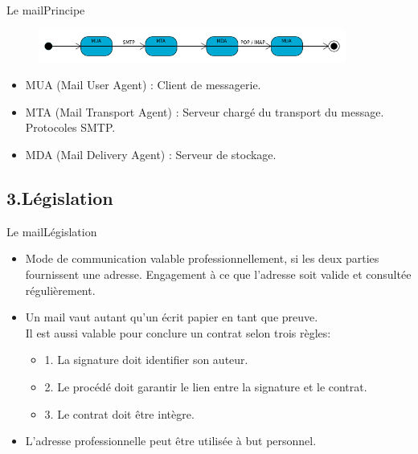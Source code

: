 \documentclass{beamer}
\begin{document}
\begin{frame}{Le mail}{Principe}
    \begin{figure}[h]
        \includegraphics[width=0.90\textwidth, ]{shemaM} 
        \caption{} 
        \label{fig:mesh1}
    \end{figure}
    \begin{itemize}
        \item {
            MUA (Mail User Agent) : Client de messagerie.
            }

        \item<2-> {
            MTA (Mail Transport Agent) : Serveur chargé du transport du message.  {Protocoles SMTP.}  }
   
        \item<4-> {
            MDA (Mail Delivery Agent) : Serveur de stockage.
            }
  \end{itemize}
\end{frame}




\subsection{3.Législation}
\begin{frame}{Le mail}{Législation}
    \begin{itemize}
        \item<1->{      
            Mode de communication valable professionnellement, si les deux parties fournissent une adresse. \nextline            
            Engagement à ce que l'adresse soit valide et consultée régulièrement.
        }
        \item<2->{
            Un mail vaut autant qu'un écrit papier en tant que preuve.\\
            Il est aussi valable pour conclure un contrat selon trois règles:
            \begin{itemize}
                \item 1. La signature doit identifier son auteur.
                \item 2. Le procédé doit garantir le lien entre la signature et le contrat.
                \item 3. Le contrat doit être intègre.
            \end{itemize}
        }  
        \item<3->{
            L'adresse professionnelle peut être utilisée à but personnel.
        }
    \end{itemize}
\end{frame}
\end{document}
